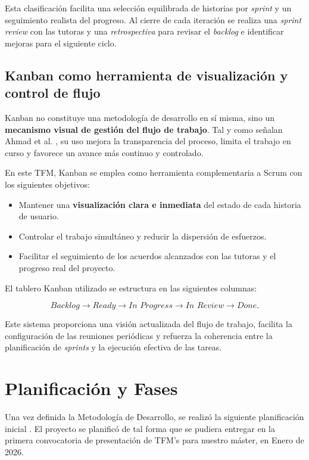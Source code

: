 \documentclass{report}
\begin{document}
Esta clasificación facilita una selección equilibrada de historias por \textit{sprint} y un seguimiento realista del progreso. Al cierre de cada iteración se realiza una \emph{sprint review} con las tutoras y una \emph{retrospectiva} para revisar el \textit{backlog} e identificar mejoras para el siguiente ciclo.

\subsection{Kanban como herramienta de visualización y control de flujo}

Kanban no constituye una metodología de desarrollo en sí misma, sino un \textbf{mecanismo visual de gestión del flujo de trabajo}. Tal y como señalan Ahmad et al. \cite{ahmad2013kanban}, su uso mejora la transparencia del proceso, limita el trabajo en curso y favorece un avance más continuo y controlado.

En este TFM, Kanban se emplea como herramienta complementaria a Scrum con los siguientes objetivos:

\begin{itemize}
    \item Mantener una \textbf{visualización clara e inmediata} del estado de cada historia de usuario.  
    \item Controlar el trabajo simultáneo y reducir la dispersión de esfuerzos.  
    \item Facilitar el seguimiento de los acuerdos alcanzados con las tutoras y el progreso real del proyecto.  
\end{itemize}

El tablero Kanban utilizado se estructura en las siguientes columnas:

\[
\textit{Backlog} \rightarrow \textit{Ready} \rightarrow \textit{In Progress} \rightarrow \textit{In Review} \rightarrow \textit{Done}.
\]

Este sistema proporciona una visión actualizada del flujo de trabajo, facilita la configuración de las reuniones periódicas y refuerza la coherencia entre la planificación de \textit{sprints} y la ejecución efectiva de las tareas.



\section{Planificación y Fases}
\label{sec:planificacion}
Una vez definida la Metodología de Desarrollo, se realizó la siguiente planificación inicial . El proyecto se planificó de tal forma que se pudiera entregar en la primera convocatoria de presentación de TFM's para nuestro máster, en Enero de 2026. 
\end{document}
